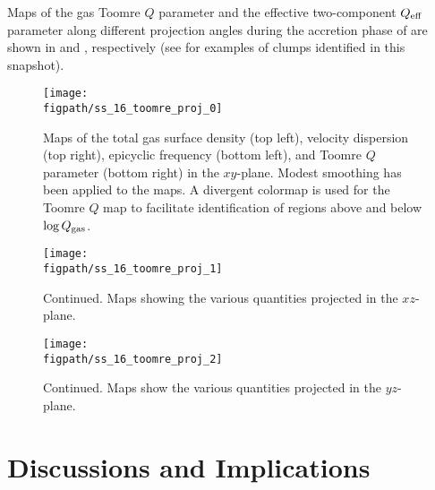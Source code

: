 \IfFileExists{emulateapjlegacy.cls}{\documentclass[iop]{emulateapjlegacy}}{\documentclass[iop]{emulateapj}}
\begin{document}
Maps of the gas Toomre $Q$ parameter and the effective two-component $Q_{\rm eff}$ parameter along different projection angles during the accretion phase of \flower are shown in  and , respectively (see  for examples of clumps identified 
in this snapshot). 

\begin{figure*}[htbp]
\centering
\texttt{[image: \\figpath/ss\_16\_toomre\_proj\_0]}
\caption{
Maps of the total gas surface density (top left), 
velocity dispersion (top right),
epicyclic frequency (bottom left), 
and Toomre $Q$ parameter (bottom right) in the $xy$-plane.
Modest smoothing has been applied to the maps. A divergent colormap is used for the Toomre $Q$ map to facilitate 
identification of regions above and below $\log{Q_{\rm gas}}$.
\label{fig:Q}}
\addtocounter{figure}{-1}
\end{figure*}

\begin{figure*}[htbp]
\centering
\texttt{[image: \\figpath/ss\_16\_toomre\_proj\_1]}
\caption{Continued. Maps showing the various quantities projected in the $xz$-plane.}
\addtocounter{figure}{-1}
\end{figure*}

\begin{figure*}[htbp]
\centering
\texttt{[image: \\figpath/ss\_16\_toomre\_proj\_2]}
\caption{Continued. Maps show the various quantities projected in the $yz$-plane.}
\end{figure*}





\section{Discussions and Implications}     \label{sec:diss}
\end{document}

